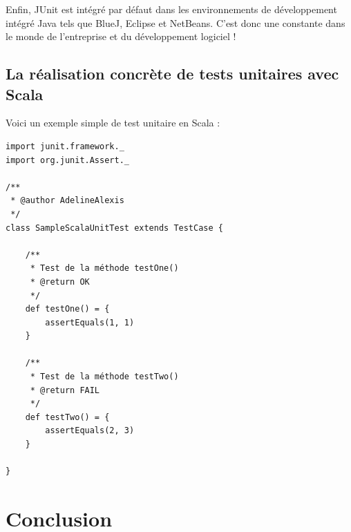 \documentclass[a4paper,11pt]{article}
\begin{document}
Enfin, JUnit est intégré par défaut dans les environnements de développement intégré Java tels que BlueJ, Eclipse et NetBeans. C'est donc une constante dans le monde de l'entreprise et du développement logiciel !


\subsection{La réalisation concrète de tests unitaires avec Scala}

Voici un exemple simple de test unitaire en Scala :

\newpage
\begin{lstlisting}[caption=Exemple de TU Scala, label=java]
import junit.framework._
import org.junit.Assert._

/**
 * @author AdelineAlexis
 */
class SampleScalaUnitTest extends TestCase {

	/**
	 * Test de la méthode testOne()
	 * @return OK
	 */
	def testOne() = {
		assertEquals(1, 1)
	}

	/**
	 * Test de la méthode testTwo()
	 * @return FAIL
	 */
	def testTwo() = {
		assertEquals(2, 3)
	}

}

\end{lstlisting}	


\section{Conclusion}


\newpage
\listoffigures  %
\listoftables
\newpage
\nocite{*}
\newpage
\end{document}
